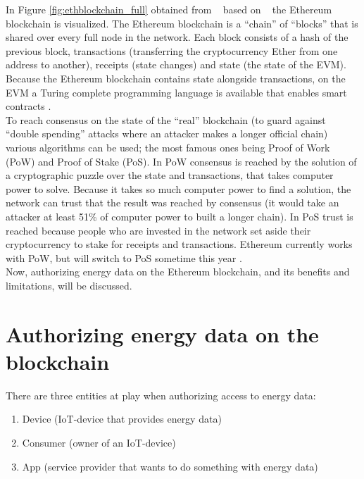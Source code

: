 \documentclass[paper=a4, fontsize=11pt]{scrartcl}
\numberwithin{equation}{section} %
\numberwithin{figure}{section}   %
\numberwithin{table}{section}    %
\begin{document}
In Figure \ref{fig:ethblockchain_full} obtained from ~\cite{ethereum} based on
~\cite{bitcoin} the Ethereum blockchain is visualized. The Ethereum blockchain
is a ``chain'' of ``blocks'' that is shared over every full node in the network.
Each block consists of a hash of the previous block, transactions (transferring
the cryptocurrency Ether from one address to another), receipts (state changes)
and state (the state of the EVM). Because the Ethereum blockchain contains state
alongside transactions, on the EVM a Turing complete programming language is
available that enables smart contracts \cite{ethereum}.\\

To reach consensus on the state of the ``real'' blockchain (to guard against
``double spending'' attacks where an attacker makes a longer official chain)
various algorithms can be used; the most famous ones being Proof of Work (PoW)
and Proof of Stake (PoS). In PoW consensus is reached by the solution of a
cryptographic puzzle over the state and transactions, that takes computer power
to solve. Because it takes so much computer power to find a solution, the
network can trust that the result was reached by consensus (it would take an
attacker at least 51\% of computer power to built a longer chain). In PoS trust
is reached because people who are invested in the network set aside their
cryptocurrency to stake for receipts and transactions. Ethereum currently works
with PoW, but will switch to PoS sometime this year \cite{ethereum}.\\

Now, authorizing energy data on the Ethereum blockchain, and its benefits and
limitations, will be discussed.\\

\section{Authorizing energy data on the blockchain}

There are three entities at play when authorizing access to energy data:

\begin{enumerate}
  \item Device (IoT-device that provides energy data)
  \item Consumer (owner of an IoT-device)
  \item App (service provider that wants to do something with energy data)
\end{enumerate}
\end{document}

